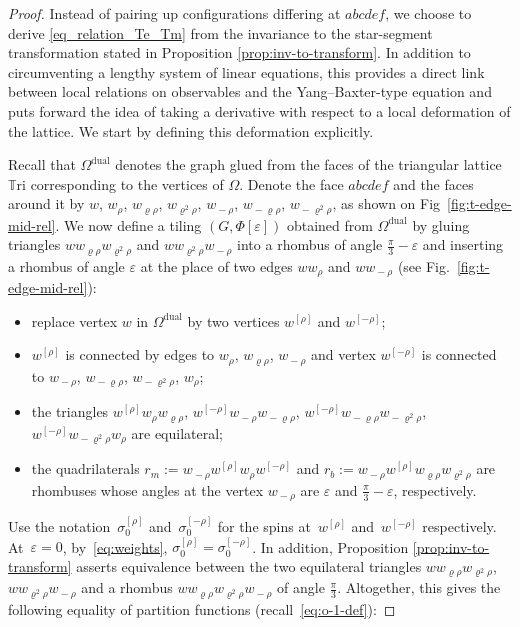 \documentclass[reqno,11pt,a4paper]{amsart}
\theoremstyle{remark}
\newcommand{\T}{\mathbb{T}\mathrm{ri}}
\newcommand{\OmegaDual}{\Omega^{\mathrm{dual}}}
\newcommand{\weOne}{w_{\rho}}
\newcommand{\weTwo}{w_{\varrho\rho}}
\newcommand{\weThree}{w_{\varrho^2\rho}}
\newcommand{\weFour}{w_{\!-\rho}}
\newcommand{\weFive}{w_{\!-\varrho\rho}}
\newcommand{\weSix}{w_{\!-\varrho^2\rho}}
\newcommand{\wrho}{w^{\left[\rho \right]}}
\newcommand{\wmrho}{w^{\left[-\rho \right]}}
\begin{document}
\begin{proof}
	Instead of pairing up configurations differing at $abcdef$, we choose to derive \eqref{eq_relation_Te_Tm} from the invariance to the star-segment transformation stated in Proposition \ref{prop:inv-to-transform}. In addition to circumventing a lengthy system of linear equations, this provides a direct link between local relations on observables and the Yang--Baxter-type equation and puts forward the idea of taking a derivative with respect to a local deformation of the lattice. We start by defining this deformation explicitly.
	
	Recall that $\OmegaDual$ denotes the graph glued from the faces of the triangular lattice $\T$ corresponding to the vertices of $\Omega$. Denote the face $abcdef$ and the faces around it by $w$, $\weOne$, $\weTwo$, $\weThree$, $\weFour$, $\weFive$, $\weSix$, as shown on Fig~\ref{fig:t-edge-mid-rel}. We now define a tiling $(G, \Phi[\varepsilon])$ obtained from $\OmegaDual$ by gluing triangles $w \weTwo \weThree$ and $w \weThree \weFour$ into a rhombus of angle $\tfrac{\pi}{3} -\varepsilon$ and inserting a rhombus of angle $\varepsilon$ at the place of two edges $w \weOne$ and $w \weFour$ (see Fig.~\ref{fig:t-edge-mid-rel}):
	\begin{itemize}
		\item replace vertex $w$ in $\OmegaDual$ by two vertices $\wrho$ and $\wmrho$;
		\item $\wrho$ is connected by edges to $\weOne$, $\weTwo$, $\weFour$ and vertex $\wmrho$ is connected to $\weFour$, $\weFive$, $\weSix$,  $\weOne$;
		\item the triangles $\wrho \weOne \weTwo$, $\wmrho \weFour \weFive$,   $\wmrho \weFive \weSix$, $\wmrho \weSix \weOne$ are equilateral;
		\item the quadrilaterals $ r_{m}:=\weFour \wrho  \weOne \wmrho$ and $ r_{b}:=\weFour \wrho \weTwo \weThree$ are rhombuses whose angles at the vertex $\weFour$ are $\varepsilon$ and $\tfrac{\pi}{3} - \varepsilon$, respectively.
	\end{itemize}
	Use the notation~$\sigma_0^{[\rho]}$ and~$\sigma_0^{[-\rho]}$ for the spins at~$\wrho$ and~$\wmrho$ respectively.
	At~$\varepsilon = 0$, by~\eqref{eq:weights}, $\sigma_0^{[\rho]}=\sigma_0^{[-\rho]}$.
	In addition, Proposition \ref{prop:inv-to-transform} asserts equivalence between the two equilateral triangles $w \weTwo \weThree$, $w \weThree \weFour$ and a rhombus  $w \weTwo \weThree \weFour$ of angle $\tfrac{\pi}{3}$. 
	Altogether, this gives the following equality of partition functions (recall~\eqref{eq:o-1-def}):

\end{proof}
\end{document}
